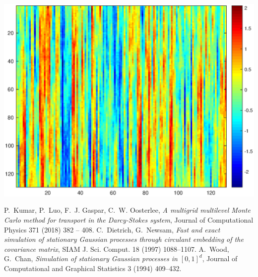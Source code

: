 \documentclass{extarticle}
\begin{document}
\includegraphics[scale=0.4]{f3.eps}

\begin{thebibliography}{10}
P.~Kumar, P.~Luo, F.~J. Gaspar, C.~W. Oosterlee, \textit{A multigrid multilevel
  Monte Carlo method for transport in the Darcy-Stokes system}, Journal of
  Computational Physics 371 (2018) 382 -- 408.  
C.~{Dietrich}, G.~{Newsam}, \textit{Fast and exact simulation of stationary
  Gaussian processes through circulant embedding of the covariance matrix},
  SIAM J. Sci. Comput. 18 (1997) 1088--1107.
A.~{Wood}, G.~{Chan}, \textit{Simulation of stationary Gaussian processes in
  $[0, 1]^d$}, Journal of Computational and Graphical Statistics 3 (1994)
  409--432.
\end{thebibliography}
\end{document}
